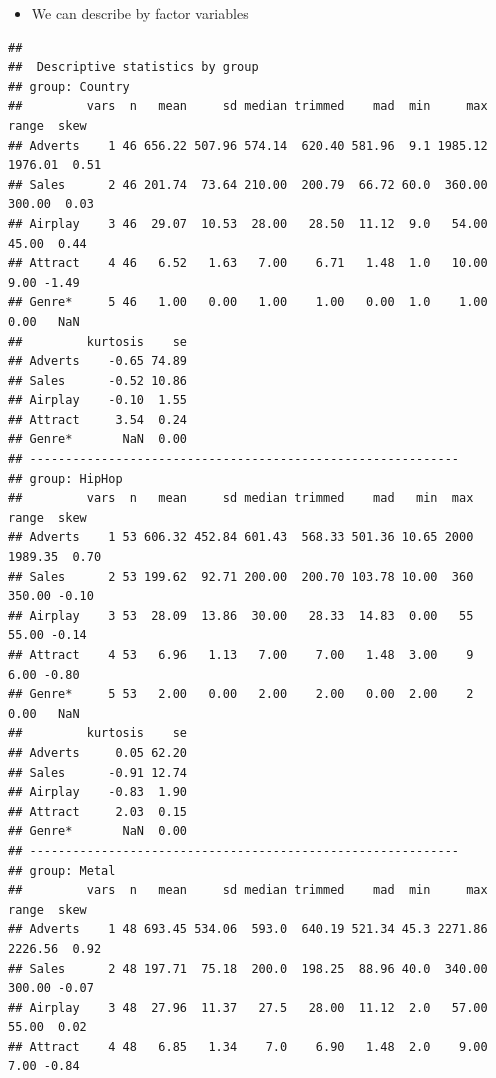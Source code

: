 \documentclass[
]{book}
\newenvironment{Shaded}{\begin{snugshade}}{\end{snugshade}}
\newcommand{\DataTypeTok}[1]{\textcolor[rgb]{0.13,0.29,0.53}{#1}}
\newcommand{\KeywordTok}[1]{\textcolor[rgb]{0.13,0.29,0.53}{\textbf{#1}}}
\newcommand{\NormalTok}[1]{#1}
\newcommand{\OperatorTok}[1]{\textcolor[rgb]{0.81,0.36,0.00}{\textbf{#1}}}
\providecommand{\tightlist}{%
  \setlength{\itemsep}{0pt}\setlength{\parskip}{0pt}}
\begin{document}
\begin{itemize}
\tightlist
\item
  We can describe by factor variables
\end{itemize}

\begin{Shaded}
\end{Shaded}

\begin{verbatim}
## 
##  Descriptive statistics by group 
## group: Country
##         vars  n   mean     sd median trimmed    mad  min     max   range  skew
## Adverts    1 46 656.22 507.96 574.14  620.40 581.96  9.1 1985.12 1976.01  0.51
## Sales      2 46 201.74  73.64 210.00  200.79  66.72 60.0  360.00  300.00  0.03
## Airplay    3 46  29.07  10.53  28.00   28.50  11.12  9.0   54.00   45.00  0.44
## Attract    4 46   6.52   1.63   7.00    6.71   1.48  1.0   10.00    9.00 -1.49
## Genre*     5 46   1.00   0.00   1.00    1.00   0.00  1.0    1.00    0.00   NaN
##         kurtosis    se
## Adverts    -0.65 74.89
## Sales      -0.52 10.86
## Airplay    -0.10  1.55
## Attract     3.54  0.24
## Genre*       NaN  0.00
## ------------------------------------------------------------ 
## group: HipHop
##         vars  n   mean     sd median trimmed    mad   min  max   range  skew
## Adverts    1 53 606.32 452.84 601.43  568.33 501.36 10.65 2000 1989.35  0.70
## Sales      2 53 199.62  92.71 200.00  200.70 103.78 10.00  360  350.00 -0.10
## Airplay    3 53  28.09  13.86  30.00   28.33  14.83  0.00   55   55.00 -0.14
## Attract    4 53   6.96   1.13   7.00    7.00   1.48  3.00    9    6.00 -0.80
## Genre*     5 53   2.00   0.00   2.00    2.00   0.00  2.00    2    0.00   NaN
##         kurtosis    se
## Adverts     0.05 62.20
## Sales      -0.91 12.74
## Airplay    -0.83  1.90
## Attract     2.03  0.15
## Genre*       NaN  0.00
## ------------------------------------------------------------ 
## group: Metal
##         vars  n   mean     sd median trimmed    mad  min     max   range  skew
## Adverts    1 48 693.45 534.06  593.0  640.19 521.34 45.3 2271.86 2226.56  0.92
## Sales      2 48 197.71  75.18  200.0  198.25  88.96 40.0  340.00  300.00 -0.07
## Airplay    3 48  27.96  11.37   27.5   28.00  11.12  2.0   57.00   55.00  0.02
## Attract    4 48   6.85   1.34    7.0    6.90   1.48  2.0    9.00    7.00 -0.84

\end{verbatim}
\end{document}
